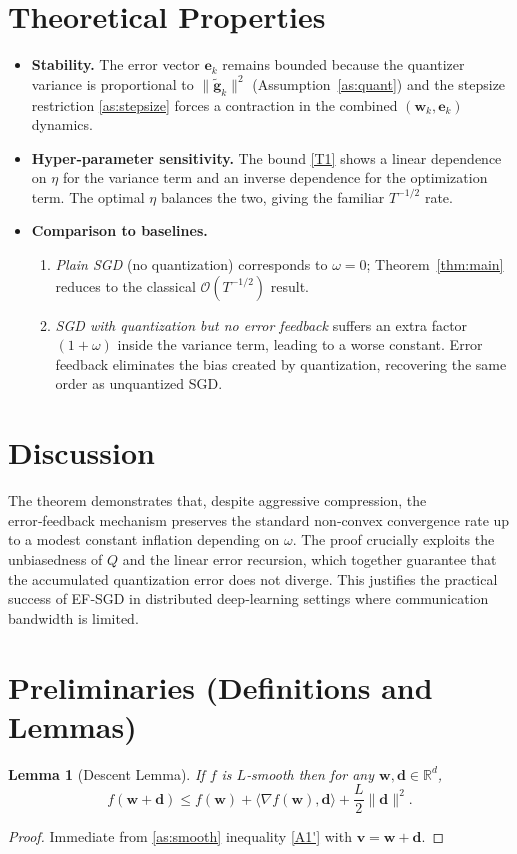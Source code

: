 \documentclass{article}
\newtheorem{lemma}{Lemma}
\newcommand{\R}{\mathbb{R}}
\newcommand{\ip}[2]{\langle #1,#2\rangle}
\begin{document}
\section*{Theoretical Properties}
\begin{itemize}
\item \textbf{Stability.} The error vector $\bm e_k$ remains bounded because the quantizer variance is proportional to $\|\tilde{\bm g}_k\|^2$ (Assumption~\ref{as:quant}) and the stepsize restriction \ref{as:stepsize} forces a contraction in the combined \((\bm w_k,\bm e_k)\) dynamics.
\item \textbf{Hyper‑parameter sensitivity.} The bound \eqref{T1} shows a linear dependence on $\eta$ for the variance term and an inverse dependence for the optimization term. The optimal $\eta$ balances the two, giving the familiar $T^{-1/2}$ rate.
\item \textbf{Comparison to baselines.}
    \begin{enumerate}[label=(\alph*)]
    \item \emph{Plain SGD} (no quantization) corresponds to $\omega=0$; Theorem~\ref{thm:main} reduces to the classical $\mathcal O(T^{-1/2})$ result.
    \item \emph{SGD with quantization but no error feedback} suffers an extra factor $(1+\omega)$ inside the variance term, leading to a worse constant. Error feedback eliminates the bias created by quantization, recovering the same order as unquantized SGD.
    \end{enumerate}
\end{itemize}

\section*{Discussion}
The theorem demonstrates that, despite aggressive compression, the error‑feedback mechanism preserves the standard non‑convex convergence rate up to a modest constant inflation depending on $\omega$. The proof crucially exploits the unbiasedness of $Q$ and the linear error recursion, which together guarantee that the accumulated quantization error does not diverge. This justifies the practical success of EF‑SGD in distributed deep‑learning settings where communication bandwidth is limited.

\newpage
\section*{Preliminaries (Definitions and Lemmas)}
\begin{lemma}[Descent Lemma]\label{lem:descent}
If $f$ is $L$‑smooth then for any $\bm w,\bm d\in\R^d$,
\[
f(\bm w+\bm d)\le f(\bm w)+\ip{\nabla f(\bm w)}{\bm d}
+\frac{L}{2}\|\bm d\|^2 .
\]
\end{lemma}
\begin{proof}
Immediate from \ref{as:smooth} inequality \eqref{A1'} with $\bm v=\bm w+\bm d$.
\end{proof}
\end{document}

